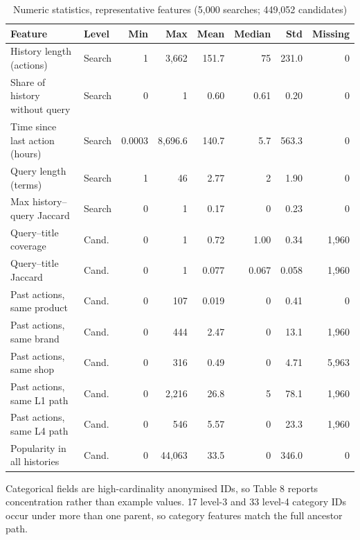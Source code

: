 \documentclass[11pt,a4paper]{article}
\newcommand{\hd}[1]{\textbf{#1}}
\newcommand{\tablestyle}{\small}
\newcommand{\headrow}{}
\begin{document}
\begin{table}[H]
\caption{Numeric statistics, representative features (5,000 searches; 449,052 candidates)}
\tablestyle
\centering
\setlength{\tabcolsep}{4pt}
\begin{tabularx}{\textwidth}{>{\raggedright\arraybackslash}p{4.6cm} l r r r r r r}
\toprule
\headrow \hd{Feature} & \hd{Level} & \hd{Min} & \hd{Max} & \hd{Mean} & \hd{Median} & \hd{Std} & \hd{Missing} \\
\midrule
History length (actions) & Search & 1 & 3,662 & 151.7 & 75 & 231.0 & 0 \\
Share of history without query & Search & 0 & 1 & 0.60 & 0.61 & 0.20 & 0 \\
Time since last action (hours) & Search & 0.0003 & 8,696.6 & 140.7 & 5.7 & 563.3 & 0 \\
Query length (terms) & Search & 1 & 46 & 2.77 & 2 & 1.90 & 0 \\
Max history--query Jaccard & Search & 0 & 1 & 0.17 & 0 & 0.23 & 0 \\
Query--title coverage & Cand. & 0 & 1 & 0.72 & 1.00 & 0.34 & 1,960 \\
Query--title Jaccard & Cand. & 0 & 1 & 0.077 & 0.067 & 0.058 & 1,960 \\
Past actions, same product & Cand. & 0 & 107 & 0.019 & 0 & 0.41 & 0 \\
Past actions, same brand & Cand. & 0 & 444 & 2.47 & 0 & 13.1 & 1,960 \\
Past actions, same shop & Cand. & 0 & 316 & 0.49 & 0 & 4.71 & 5,963 \\
Past actions, same L1 path & Cand. & 0 & 2,216 & 26.8 & 5 & 78.1 & 1,960 \\
Past actions, same L4 path & Cand. & 0 & 546 & 5.57 & 0 & 23.3 & 1,960 \\
Popularity in all histories & Cand. & 0 & 44,063 & 33.5 & 0 & 346.0 & 0 \\
\bottomrule
\end{tabularx}
\end{table}

Categorical fields are high-cardinality anonymised IDs, so Table 8 reports concentration rather than example values. 17 level-3 and 33 level-4 category IDs occur under more than one parent, so category features match the full ancestor path.
\end{document}
